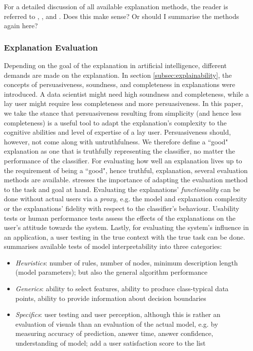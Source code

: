 For a detailed discussion of all available explanation methods, the reader is referred to \cite{liu2017towards}, \cite{gilpin2018explaining}, and \cite{ventocilla2018taxonomy}.\newline
{\color{blue}Does this make sense? Or should I summarise the methods again here?}\newline



\subsubsection{Explanation Evaluation}
Depending on the goal of the explanation in artificial intelligence, different demands are made on the explanation. In section \ref{subsec:explainability}, the concepts of persuasiveness, soundness, and completeness in explanations were introduced. A data scientist might need high soundness and completeness, while a lay user might require less completeness and more persuasiveness. In this paper, we take the stance that persuasiveness resulting from simplicity (and hence less completeness) is a useful tool to adapt the explanation's complexity to the cognitive abilities and level of expertise of a lay user. Persuasiveness should, however, not come along with untruthfulness. We therefore define a ``good" explanation as one that is truthfully representing the classifier, no matter the performance of the classifier.\newline
For evaluating how well an explanation lives up to the requirement of being a ``good", hence truthful, explanation, several evaluation methods are available. \cite{gilpin2018explaining} stresses the importance of adapting the evaluation method to the task and goal at hand. Evaluating the explanations' \textit{functionality} can be done without actual users via a \textit{proxy}, e.g. the model and explanation complexity or the explanations' fidelity with respect to the classifier's behaviour. Usability tests or human performance tests assess the effects of the explanations on the user's attitude towards the system. Lastly, for evaluating the system's influence in an application, a user testing in the true context with the true task can be done.\newline
\cite{bibal2016interpretability} summarises available tests of model interpretability into three categories:
\begin{itemize}
	\item \textit{Heuristics}: number of rules, number of nodes, minimum description length (model parameters); but also the general algorithm performance \cite{richardson2018survey}
	\item \textit{Generics}: ability to select features, ability to produce class-typical data points, ability to provide information about decision boundaries
	\item \textit{Specifics}: user testing and user perception, although this is rather an evaluation of visuals than an evaluation of the actual model, e.g. by measuring accuracy of prediction, answer time, answer confidence, understanding of model; \cite{richardson2018survey} add a user satisfaction score to the list
\end{itemize}
